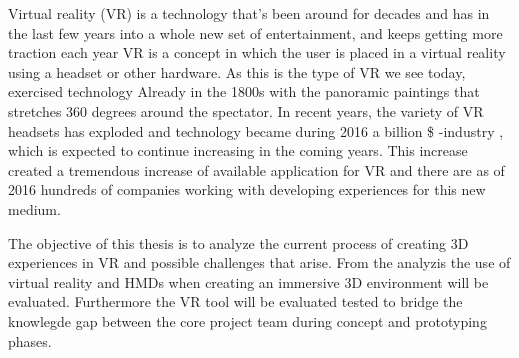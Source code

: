 Virtual reality (VR) is a technology that's been around for decades and has in the last few years into a whole new set of entertainment, and keeps getting more traction each year
\cite{VR:mazuryk1996virtual}
VR is a concept in which the user is placed in a virtual reality using a headset or other hardware. As this is the type of VR we see today, exercised technology Already in the 1800s with the panoramic paintings that stretches 360 degrees around the spectator. In recent years, the variety of VR headsets has exploded and technology became during 2016 a billion \$ -industry , which is expected to continue increasing in the coming years.
\cite{VR_stats:statista}
This increase created a tremendous increase of available application for VR and there are as of 2016 hundreds of companies working with developing experiences for this new medium.


The objective of this thesis is to analyze the current process of creating 3D experiences in VR and possible challenges that arise. From the analyzis the use of virtual reality and HMDs when creating an immersive 3D environment will be evaluated. Furthermore the VR tool will be evaluated tested to bridge the knowlegde gap between the core project team during concept and prototyping phases.

